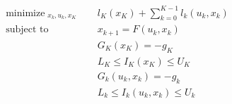 \documentclass[12pt]{article}
\DeclareMathOperator*{\minimize}{minimize}
\begin{document}
\begin{subequations}
    \begin{align}
        \minimize_{\substack{x_k, u_k,x_K}} \quad & l_K(x_K) + \sum_{k=0}^{K-1} l_k(u_k, x_k) \label{eq:LQOCP-objective} \\
        \textrm{subject to} \quad                 & x_{k+1} = F(u_k, x_k)\label{eq:LQOCP-dynamicsconstraints}            \\
                                                  & G_K(x_{K})  =  - g_K   \label{eq:LQOCP-endconstraint}                \\
                                                  & L_K \leq I_K(x_{K})  \leq U_K    \label{eq:LQOCP-endineq}            \\
                                                  & G_{k}(u_k, x_k)   = - g_k         \label{eq:LQOCP-stageconstraints} \\ 
                                                  & L_k \leq I_k(u_{k}, x_{k})  \leq U_k    \label{eq:LQOCP-stageineq}   
    \end{align}
    \label{eq:LQOCP}
\end{subequations}
\end{document}
